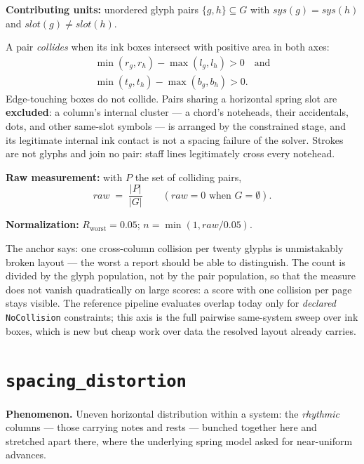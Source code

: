 \documentclass[11pt,letterpaper]{report}
\newcounter{requirement}[chapter]
\begin{document}
\begin{requirement}
\label{req:qmc:collision}
\textbf{Contributing units:} unordered glyph pairs $\{g, h\} \subseteq G$
with $\mathit{sys}(g) = \mathit{sys}(h)$ and
$\mathit{slot}(g) \ne \mathit{slot}(h)$.

A pair \emph{collides} when its ink boxes intersect with positive area in
both axes:
\[
\begin{gathered}
  \min(r_g, r_h) - \max(l_g, l_h) > 0
  \quad\text{and}\\
  \min(t_g, t_h) - \max(b_g, b_h) > 0 .
\end{gathered}
\]
Edge-touching boxes do not collide. Pairs sharing a horizontal spring slot
are \textbf{excluded}: a column's internal cluster --- a chord's noteheads,
their accidentals, dots, and other same-slot symbols --- is arranged by the
constrained stage, and its legitimate internal ink contact is not a
spacing failure of the solver. Strokes are not glyphs and join no pair:
staff lines legitimately cross every notehead.

\textbf{Raw measurement:} with $P$ the set of colliding pairs,
\[
  \mathit{raw} \;=\; \frac{|P|}{|G|}
  \qquad (\mathit{raw} = 0 \text{ when } G = \emptyset).
\]

\textbf{Normalization:} $R_{\mathrm{worst}} = 0.05$;
$n = \min(1, \mathit{raw} / 0.05)$.
\end{requirement}

\begin{rationale}
The anchor says: one cross-column collision per twenty glyphs is
unmistakably broken layout --- the worst a report should be able to
distinguish. The count is divided by the glyph population, not by the pair
population, so that the measure does not vanish quadratically on large
scores: a score with one collision per page stays visible. The reference
pipeline evaluates overlap today only for \emph{declared}
\texttt{NoCollision} constraints; this axis is the full pairwise
same-system sweep over ink boxes, which is new but cheap work over data
the resolved layout already carries.
\end{rationale}

\section{\texttt{spacing\_distortion}}
\label{sec:metrics:spacing}

\textbf{Phenomenon.} Uneven horizontal distribution within a system: the
\emph{rhythmic} columns --- those carrying notes and rests --- bunched
together here and stretched apart there, where the underlying spring model
asked for near-uniform advances.
\end{document}
